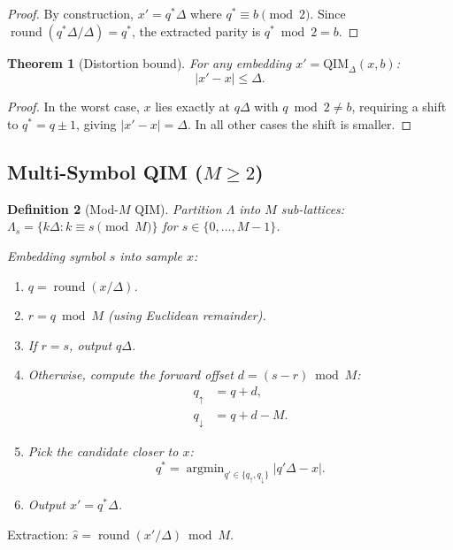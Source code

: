 \documentclass[11pt,a4paper]{article}
\newtheorem{theorem}{Theorem}[section]
\newtheorem{definition}[theorem]{Definition}
\newcommand{\abs}[1]{\left| #1 \right|}
\DeclareMathOperator{\round}{round}
\DeclareMathOperator{\argmin}{argmin}
\begin{document}
\begin{proof}
By construction, $x' = q^*\Delta$ where $q^* \equiv b \pmod{2}$.
Since $\round(q^*\Delta / \Delta) = q^*$, the extracted parity is
$q^* \bmod 2 = b$.
\end{proof}

\begin{theorem}[Distortion bound]
\label{thm:distortion}
For any embedding $x' = \mathrm{QIM}_\Delta(x, b)$:
\[
    \abs{x' - x} \leq \Delta.
\]
\end{theorem}

\begin{proof}
In the worst case, $x$ lies exactly at $q\Delta$ with $q \bmod 2 \neq b$,
requiring a shift to $q^* = q \pm 1$, giving $\abs{x' - x} = \Delta$.
In all other cases the shift is smaller.
\end{proof}

\subsection{Multi-Symbol QIM ($M \geq 2$)}
\label{sec:mod-m-qim}

\begin{definition}[Mod-$M$ QIM]
Partition $\Lambda$ into $M$ sub-lattices:
$\Lambda_s = \{ k\Delta : k \equiv s \pmod{M} \}$ for $s \in \{0, \ldots, M-1\}$.

Embedding symbol $s$ into sample $x$:
\begin{enumerate}
    \item $q = \round(x / \Delta)$.
    \item $r = q \bmod M$ (using Euclidean remainder).
    \item If $r = s$, output $q\Delta$.
    \item Otherwise, compute the forward offset $d = (s - r) \bmod M$:
          \begin{align}
              q_{\uparrow} &= q + d, \\
              q_{\downarrow} &= q + d - M.
          \end{align}
    \item Pick the candidate closer to $x$:
          \[
              q^* = \argmin_{q' \in \{q_\uparrow, q_\downarrow\}} \abs{q'\Delta - x}.
          \]
    \item Output $x' = q^* \Delta$.
\end{enumerate}
\end{definition}

Extraction: $\hat{s} = \round(x'/\Delta) \bmod M$.
\end{document}
